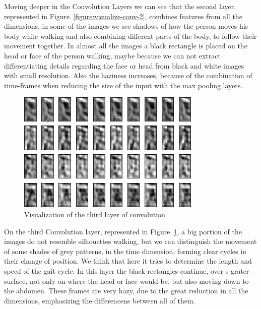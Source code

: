 \documentclass[12pt]{article}
\theoremstyle{definition}
\begin{document}
	Moving deeper in the Convolution Layers we can see that the second layer, represented in Figure~\ref{figure:visualize-conv-2}, combines features from all the dimensions, in some of the images we see shadows of how the person moves his body while walking and also combining different parts of the body, to follow their movement together. In almost all the images a black rectangle is placed on the head or face of the person walking, maybe because we can not extract differentiating details regarding the face or head from black and white images with small resolution. Also the haziness increases, because of the combination of time-frames when reducing the size of the input with the max pooling layers.

	\begin{figure}[ht]
		\includegraphics[width=\textwidth]{conv-see/visualization-8.jpg}
		\caption{Visualization of the third layer of convolution}
		\label{figure:visualize-conv-3}
	\end{figure}

	On the third Convolution layer, represented in Figure~\ref{figure:visualize-conv-3}, a big portion of the images do not resemble silhouettes walking, but we can distinguish the movement of some shades of grey patterns, in the time dimension, forming clear cycles in their change of position. We think that here it tries to determine the length and speed of the gait cycle. In this layer the black rectangles continue, over s grater surface, not only on where the head or face would be, but also moving down to the abdomen. These frames are very hazy, due to the great reduction in all the dimensions, emphasizing the differencens between all of them.
\end{document}

